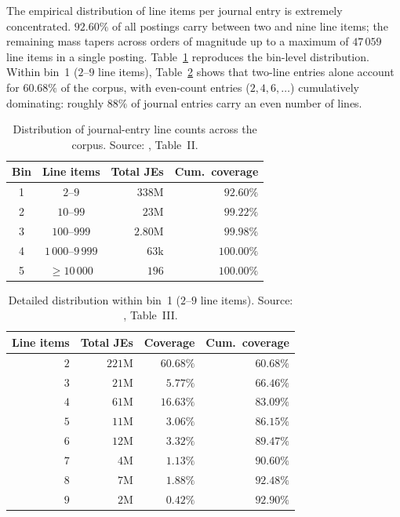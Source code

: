 The empirical distribution of line items per journal entry is
extremely concentrated.  $92.60\%$ of all postings carry between
two and nine line items; the remaining mass tapers across orders of
magnitude up to a maximum of $47\,059$ line items in a single
posting.  Table~\ref{tab:emp:bins} reproduces the bin-level
distribution.  Within bin~1 ($2$--$9$ line items),
Table~\ref{tab:emp:bin1} shows that two-line entries alone account
for $60.68\%$ of the corpus, with even-count entries
($2,4,6,\ldots$) cumulatively dominating: roughly $88\%$ of
journal entries carry an even number of lines.

\begin{table}[H]
  \centering
  \caption{Distribution of journal-entry line counts across the
    corpus.  Source: \citet{ivertowski2024apn}, Table~II.}
  \label{tab:emp:bins}
  \begin{tabular}{ccrr}
    \toprule
    \textbf{Bin} & \textbf{Line items} & \textbf{Total JEs} &
      \textbf{Cum.\ coverage}\\
    \midrule
    1 & $2$--$9$        & $338$M          & $\phantom{0}92.60\%$\\
    2 & $10$--$99$      & $\phantom{00}23$M & $\phantom{0}99.22\%$\\
    3 & $100$--$999$    & $\phantom{000}2.80$M & $\phantom{0}99.98\%$\\
    4 & $1\,000$--$9\,999$ & $\phantom{000}63$k & $100.00\%$\\
    5 & $\geq 10\,000$  & $\phantom{0000}196$ & $100.00\%$\\
    \bottomrule
  \end{tabular}
\end{table}

\begin{table}[H]
  \centering
  \caption{Detailed distribution within bin~1 ($2$--$9$ line
    items).  Source: \citet{ivertowski2024apn}, Table~III.}
  \label{tab:emp:bin1}
  \begin{tabular}{rrrr}
    \toprule
    \textbf{Line items} & \textbf{Total JEs} & \textbf{Coverage} &
      \textbf{Cum.\ coverage}\\
    \midrule
    $2$ & $221$M          & $60.68\%$ & $60.68\%$\\
    $3$ & $\phantom{00}21$M & $\phantom{0}5.77\%$ & $66.46\%$\\
    $4$ & $\phantom{00}61$M & $16.63\%$ & $83.09\%$\\
    $5$ & $\phantom{00}11$M & $\phantom{0}3.06\%$ & $86.15\%$\\
    $6$ & $\phantom{00}12$M & $\phantom{0}3.32\%$ & $89.47\%$\\
    $7$ & $\phantom{000}4$M & $\phantom{0}1.13\%$ & $90.60\%$\\
    $8$ & $\phantom{000}7$M & $\phantom{0}1.88\%$ & $92.48\%$\\
    $9$ & $\phantom{000}2$M & $\phantom{0}0.42\%$ & $92.90\%$\\
    \bottomrule
  \end{tabular}
\end{table}

